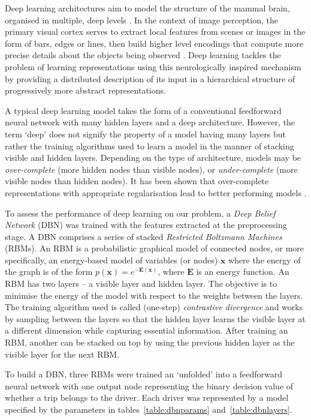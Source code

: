 \documentclass[a4paper, 11pt, twocolumn]{report}
\begin{document}
Deep learning architectures aim to model the structure of the mammal brain, organised in multiple, deep levels \cite{serre2007quantitative}. In the context of image perception, the primary visual cortex serves to extract local features from scenes or images in the form of bars, edges or lines, then build higher level encodings that compute more precise details about the objects being observed \cite{lee1998role}. Deep learning tackles the problem of learning representations using this neurologically inspired mechanism by providing a distributed description of its input in a hierarchical structure of progressively more abstract representations.

A typical deep learning model takes the form of a conventional feedforward neural network with many hidden layers and a deep architecture. However, the term `deep' does not signify the property of a model having many layers but rather the training algorithms used to learn a model in the manner of stacking visible and hidden layers. Depending on the type of architecture, models may be \textit{over-complete} (more hidden nodes than visible nodes), or \textit{under-complete} (more visible nodes than hidden nodes). It has been shown that over-complete representations with appropriate regularisation lead to better performing models \cite{vincent2010stacked}.

To assess the performance of deep learning on our problem, a \textit{Deep Belief Network} (DBN) was trained with the features extracted at the preprocessing stage. A DBN comprises a series of stacked \textit{Restricted Boltzmann Machines} (RBMs). An RBM is a probabilistic graphical model of connected nodes, or more specifically, an energy-based model of variables (or nodes) $\mathbf{x}$ where the energy of the graph is of the form $p(\mathbf{x})=e^{\mathbf{-E(x)}}$, where $\mathbf{E}$ is an energy function. An RBM has two layers -- a visible layer and hidden layer. The objective is to minimise the energy of the model with respect to the weights between the layers. The training algorithm used is called (one-step) \textit{contrastive divergence} \cite{hinton2002training} and works by sampling between the layers so that the hidden layer learns the visible layer at a different dimension while capturing essential information. After training an RBM, another can be stacked on top by using the previous hidden layer as the visible layer for the next RBM.

To build a DBN, three RBMs were trained an `unfolded' into a feedforward neural network with one output node representing the binary decision value of whether a trip belongs to the driver. Each driver was represented by a model specified by the parameters in tables~\ref{table:dbnparams} and~\ref{table:dbnlayers}.
\end{document}
